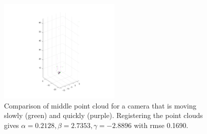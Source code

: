 \documentclass[12pt,a4paper]{article}
\begin{document}
	\begin{figure}[h]
		\centering
		\includegraphics[height=50mm, trim = 20mm 10mm 20mm 100mm, clip]{slow_fast.png}
		\caption{Comparison of middle point cloud for a camera that is moving slowly (green) and quickly (purple). Registering the point clouds gives $\alpha = 0.2128, \beta = 2.7353, \gamma = -2.8896$ with rmse 0.1690.}
		\label{f: slow v med}
	\end{figure}
\end{document}
